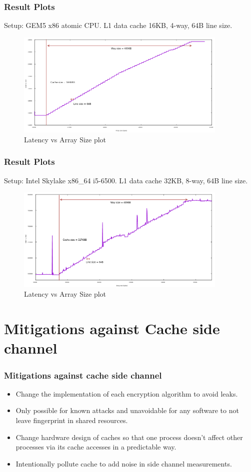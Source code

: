 \documentclass[10pt]{beamer}
\begin{document}
\begin{frame}
\frametitle{Result Plots}
Setup: GEM5 x86 atomic CPU. L1 data cache 16KB, 4-way, 64B line size.
\begin{figure}
\includegraphics[width=0.9\textwidth]{figures/reverse_eng_16kb}
\caption{Latency vs Array Size plot}
\end{figure}
\end{frame}

\begin{frame}
\frametitle{Result Plots}
Setup: Intel Skylake x86\_64 i5-6500. L1 data cache 32KB, 8-way, 64B line size.
\begin{figure}
\includegraphics[width=0.9\textwidth]{figures/reverse_eng_32kb}
\caption{Latency vs Array Size plot}
\end{figure}
\end{frame}

\section{Mitigations against Cache side channel}

\begin{frame}
\frametitle{Mitigations against cache side channel}
\begin{itemize}
    \item Change the implementation of each encryption algorithm to avoid leaks.
    \item Only possible for known attacks and unavoidable for any software to not leave fingerprint in shared resources.
    \item Change hardware design of caches so that one process doesn’t affect other processes via its cache accesses in a predictable way.
    \item Intentionally pollute cache to add noise in side channel measurements.
\end{itemize}
\end{frame}
\end{document}
